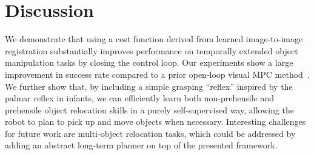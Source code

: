 \section{Discussion}

We demonstrate that using a cost function derived from learned image-to-image registration substantially improves performance on temporally extended object manipulation tasks by closing the control loop. Our experiments show a large improvement in success rate compared to a prior open-loop visual MPC method~\cite{sna}. We further show that, by including a simple grasping ``reflex'' inspired by the palmar reflex in infants, we can efficiently learn both non-prehensile and prehensile object relocation skills in a purely self-supervised way, allowing the robot to plan to pick up and move objects when necessary.  
Interesting challenges for future work are multi-object relocation tasks, which could be addressed by adding an abstract long-term planner on top of the presented framework.
